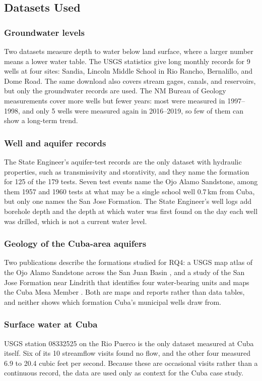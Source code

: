 \documentclass[10pt,twocolumn,letterpaper]{article}
\begin{document}
\subsection{Datasets Used}
\subsubsection{Groundwater levels}
Two datasets measure depth to water below land surface, where a larger number means a lower
water table. The USGS statistics \citep{usgs_stats} give long monthly records for 9 wells at four
sites: Sandia, Lincoln Middle School in Rio Rancho, Bernalillo, and Dome Road. The same download also covers stream gages, canals, and
reservoirs, but only the groundwater records are used. The NM Bureau of Geology measurements
\citep{nmwd_levels} cover more wells but fewer years: most were measured in 1997--1998, and only
5 wells were measured again in 2016--2019, so few of them can show a long-term trend.

\subsubsection{Well and aquifer records}
The State Engineer's aquifer-test records \citep{ose_aquifertests} are the only dataset with
hydraulic properties, such as transmissivity and storativity, and they name the formation for
125 of the 179 tests. Seven test events name the Ojo Alamo Sandstone, among them 1957 and 1960
tests at what may be a single school well 0.7\,km from Cuba, but only one names the San Jose
Formation. The State Engineer's well logs \citep{ose_welllogs} add borehole depth and the depth at which
water was first found on the day each well was drilled, which is not a current water level.

\subsubsection{Geology of the Cuba-area aquifers}
Two publications describe the formations studied for RQ4: a USGS map atlas of the Ojo Alamo
Sandstone across the San Juan Basin \citep{thorn1990}, and a study of the San Jose Formation near
Lindrith that identifies four water-bearing units and maps the Cuba Mesa Member
\citep{blandford2025}. Both are maps and reports rather than data tables, and neither shows which
formation Cuba's municipal wells draw from.

\subsubsection{Surface water at Cuba}
USGS station 08332525 on the Rio Puerco \citep{usgs_riopuerco} is the only dataset measured at
Cuba itself. Six of its 10 streamflow visits found no flow, and the other four measured 6.9 to
20.4 cubic feet per second. Because these are occasional visits rather than a continuous record,
the data are used only as context for the Cuba case study.
\end{document}
